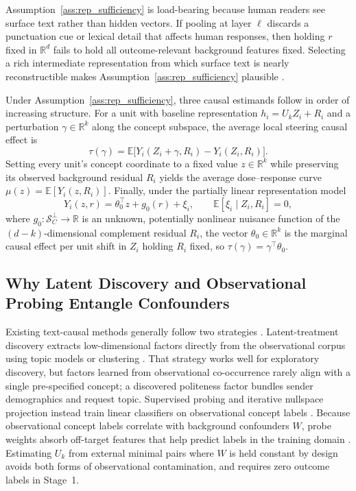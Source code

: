 \documentclass[11pt]{article}
\begin{document}
Assumption~\ref{ass:rep_sufficiency} is load-bearing because human readers see surface text rather than hidden vectors. If pooling at layer $\ell$ discards a punctuation cue or lexical detail that affects human responses, then holding $r$ fixed in $\mathbb{R}^d$ fails to hold all outcome-relevant background features fixed. Selecting a rich intermediate representation from which surface text is nearly reconstructible makes Assumption~\ref{ass:rep_sufficiency} plausible \citep{morris2023text}.

Under Assumption~\ref{ass:rep_sufficiency}, three causal estimands follow in order of increasing structure. For a unit with baseline representation $h_i = U_k Z_i + R_i$ and a perturbation $\gamma \in \mathbb{R}^k$ along the concept subspace, the average local steering causal effect is
\begin{equation}\label{eq:lce}
\tau(\gamma) = \mathbb{E}\big[Y_i(Z_i + \gamma, R_i) - Y_i(Z_i, R_i)\big].
\end{equation}
Setting every unit's concept coordinate to a fixed value $z \in \mathbb{R}^k$ while preserving its observed background residual $R_i$ yields the average dose--response curve $\mu(z) = \mathbb{E}[Y_i(z, R_i)]$. Finally, under the partially linear representation model
\begin{equation}\label{eq:plm}
Y_i(z, r) = \theta_0^\top z + g_0(r) + \xi_i, \qquad \mathbb{E}[\xi_i \mid Z_i, R_i] = 0,
\end{equation}
where $g_0 : \mathcal{S}_C^\perp \to \mathbb{R}$ is an unknown, potentially nonlinear nuisance function of the $(d-k)$-dimensional complement residual $R_i$, the vector $\theta_0 \in \mathbb{R}^k$ is the marginal causal effect per unit shift in $Z_i$ holding $R_i$ fixed, so $\tau(\gamma) = \gamma^\top \theta_0$.

\subsection{Why Latent Discovery and Observational Probing Entangle Confounders}

Existing text-causal methods generally follow two strategies \citep{keith2020text,pryzant2021causal,feder2022causal}. Latent-treatment discovery extracts low-dimensional factors directly from the observational corpus using topic models or clustering \citep{fong2016discovery,fong2023causal}. That strategy works well for exploratory discovery, but factors learned from observational co-occurrence rarely align with a single pre-specified concept; a discovered politeness factor bundles sender demographics and request topic. Supervised probing and iterative nullspace projection instead train linear classifiers on observational concept labels \citep{veitch2020adapting,ravfogel2020null,elazar2021amnesic}. Because observational concept labels correlate with background confounders $W$, probe weights absorb off-target features that help predict labels in the training domain \citep{belinkov2022probing}. Estimating $U_k$ from external minimal pairs where $W$ is held constant by design avoids both forms of observational contamination, and requires zero outcome labels in Stage~1.
\end{document}
